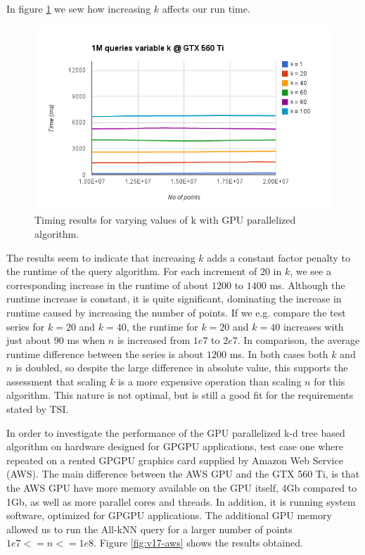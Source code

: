 In figure \ref{fig:v17-gpu-variable-k} we sew how increasing $k$ affects our run time.

\begin{figure}[ht!]
    \centering
    \includegraphics[width=120mm]{../gfx/v17-gpu-variable-k.png}
    \caption{Timing results for varying values of k with GPU parallelized algorithm.}
    \label{fig:v17-gpu-variable-k}
\end{figure}

The results seem to indicate that increasing $k$ adds a constant factor penalty to the runtime of the query algorithm. For each increment of $20$ in $k$, we see a corresponding increase in the runtime of about $1200$ to $1400$ ms. Although the runtime increase is constant, it is quite significant, dominating the increase in runtime caused by increasing the number of points. If we e.g. compare the test series for $k=20$ and $k=40$, the runtime for $k=20$ and $k=40$ increases with just about $90$ ms when $n$ is increased from $1e7$ to $2e7$. In comparison, the average runtime difference between the series is about $1200$ ms. In both cases both $k$ and $n$ is doubled, so despite the large difference in absolute value, this supports the assessment that scaling $k$ is a more expensive operation than scaling $n$ for this algorithm. This nature is not optimal, but is still a good fit for the requirements stated by TSI.

In order to investigate the performance of the GPU parallelized k-d tree based algorithm on hardware designed for GPGPU applications, test case one where repeated on a rented GPGPU graphics card supplied by Amazon Web Service (AWS). The main difference between the AWS GPU and the GTX 560 Ti, is that the AWS GPU have more memory available on the GPU itself, 4Gb compared to 1Gb, as well as more parallel cores and threads. In addition, it is running system software, optimized for GPGPU applications. The additional GPU memory allowed us to run the All-kNN query for a larger number of points $1e7<=n<=1e8$. Figure \ref{fig:v17-aws} shows the results obtained.

